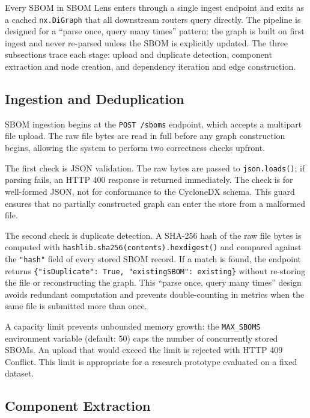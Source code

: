 Every SBOM in SBOM Lens enters through a single ingest endpoint and exits as a cached \texttt{nx.DiGraph} that all downstream routers query directly. The pipeline is designed for a ``parse once, query many times'' pattern: the graph is built on first ingest and never re-parsed unless the SBOM is explicitly updated. The three subsections trace each stage: upload and duplicate detection, component extraction and node creation, and dependency iteration and edge construction.


\subsection{Ingestion and Deduplication}
\label{sec:ingestion}

SBOM ingestion begins at the \texttt{POST /sboms} endpoint, which accepts a multipart file upload. The raw file bytes are read in full before any graph construction begins, allowing the system to perform two correctness checks upfront.

The first check is JSON validation. The raw bytes are passed to \texttt{json.loads()}; if parsing fails, an HTTP 400 response is returned immediately. The check is for well-formed JSON, not for conformance to the CycloneDX schema. This guard ensures that no partially constructed graph can enter the store from a malformed file.

The second check is duplicate detection. A SHA-256 hash of the raw file bytes is computed with \texttt{hashlib.sha256(contents).hexdigest()} and compared against the \texttt{"hash"} field of every stored SBOM record. If a match is found, the endpoint returns \texttt{\{"isDuplicate": True, "existingSBOM": existing\}} without re-storing the file or reconstructing the graph. This ``parse once, query many times'' design avoids redundant computation and prevents double-counting in metrics when the same file is submitted more than once.

A capacity limit prevents unbounded memory growth: the \texttt{MAX\_SBOMS} environment variable (default: 50) caps the number of concurrently stored SBOMs. An upload that would exceed the limit is rejected with HTTP 409 Conflict. This limit is appropriate for a research prototype evaluated on a fixed dataset.


\subsection{Component Extraction}
\label{sec:component-extraction}

